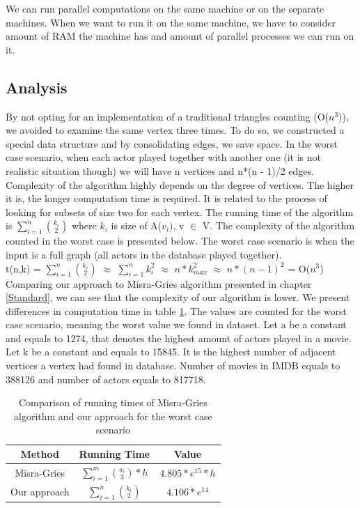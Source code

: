 We can run parallel computations on the same machine or on the separate machines. When we want to run it on the same machine, we have to consider amount of RAM the machine has and amount of parallel processes we can run on it.

\subsection{Analysis}
By not opting for an implementation of a traditional triangles counting (O(\(n^3\))), we avoided to examine the same vertex three times. To do so, we constructed a special data structure and by consolidating edges, we save space.
In the worst case scenario, when each actor played together with another one (it is not realistic situation though) we will have n vertices and n*(n - 1)/2 edges.
\\
Complexity of the algorithm highly depends on the degree of vertices. The higher it is, the longer computation time is required. It is related to the process of looking for subsets of size two for each vertex. The running time of the algorithm is \(\sum\limits_{i=1}^n{k_i \choose 2}\) where \(k_i\) is size of A(\(v_i)\), v \(\in\) V. The complexity of the algorithm counted in the worst case is presented below. The worst case scenario is when the input is a full graph (all actors in the database played together).
\\
t(n,k) = \(\sum\limits_{i=1}^n{k_i \choose 2}\) \(\approx\) \(\sum\limits_{i=1}^n{k_i^2}\) \(\approx\) \(n*k_{max}^2\) \(\approx\) \(n*(n-1)^2\) = O(\(n^3\))
\\
Comparing our approach to Misra-Gries algorithm presented in chapter \ref{Standard}, we can see that the complexity of our algorithm is lower. We present differences in computation time in table \ref{comparison}. The values are counted for the worst case scenario, meaning the worst value we found in dataset. Let a be a constant and equals to 1274, that denotes the highest amount of actors played in a movie. Let k be a constant and equals to 15845. It is the highest number of adjacent vertices a vertex had found in database. Number of movies in IMDB equals to 388126 and number of actors equals to 817718. 
\begin{table}[ht]
\caption{Comparison of running times of Misra-Gries algorithm and our approach for the worst case scenario}
\centering
\begin{tabular}{c c c}
\hline\hline
Method & Running Time & Value \\ [0.5ex]
\hline
Misra-Gries&\(\sum\limits_{i=1}^m{a_i \choose 3}*h\)&\(4.805*e^{15} * h\)\\
Our approach&\(\sum\limits_{i=1}^n{k_i \choose 2}\)&\(4.106*e^{14}\)\\
\hline
\end{tabular}
\label{comparison}
\end{table}
